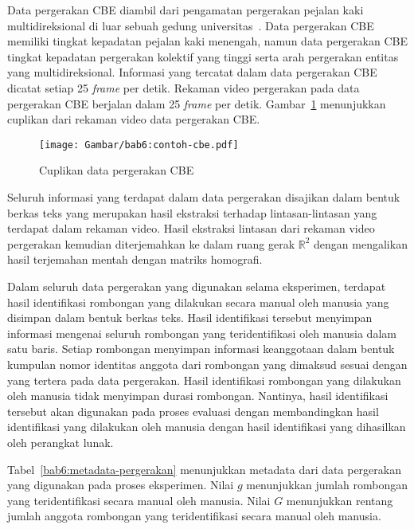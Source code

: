 \begin{enumerate}
    Data pergerakan CBE diambil dari pengamatan pergerakan pejalan kaki multidireksional di luar sebuah gedung universitas~\cite{solera:06:range-reference}. Data pergerakan CBE memiliki tingkat kepadatan pejalan kaki menengah, namun data pergerakan CBE tingkat kepadatan pergerakan kolektif yang tinggi serta arah pergerakan entitas yang multidireksional. Informasi yang tercatat dalam data pergerakan CBE dicatat setiap 25 \textit{frame} per detik. Rekaman video pergerakan pada data pergerakan CBE berjalan dalam 25 \textit{frame} per detik. Gambar~\ref{bab6:contoh-cbe} menunjukkan cuplikan dari rekaman video data pergerakan CBE.
\end{enumerate}

\begin{figure}[t]
    \centering
    \texttt{[image: Gambar/bab6:contoh-cbe.pdf]}
    \caption{Cuplikan data pergerakan CBE}
    \label{bab6:contoh-cbe}
\end{figure}

Seluruh informasi yang terdapat dalam data pergerakan disajikan dalam bentuk berkas teks yang merupakan hasil ekstraksi terhadap lintasan-lintasan yang terdapat dalam rekaman video. Hasil ekstraksi lintasan dari rekaman video pergerakan kemudian diterjemahkan ke dalam ruang gerak $\mathbb{R}^2$ dengan mengalikan hasil terjemahan mentah dengan matriks homografi.

Dalam seluruh data pergerakan yang digunakan selama eksperimen, terdapat hasil identifikasi rombongan yang dilakukan secara manual oleh manusia yang disimpan dalam bentuk berkas teks. Hasil identifikasi tersebut menyimpan informasi mengenai seluruh rombongan yang teridentifikasi oleh manusia dalam satu baris. Setiap rombongan menyimpan informasi keanggotaan dalam bentuk kumpulan nomor identitas anggota dari rombongan yang dimaksud sesuai dengan yang tertera pada data pergerakan. Hasil identifikasi rombongan yang dilakukan oleh manusia tidak menyimpan durasi rombongan. Nantinya, hasil identifikasi tersebut akan digunakan pada proses evaluasi dengan membandingkan hasil identifikasi yang dilakukan oleh manusia dengan hasil identifikasi yang dihasilkan oleh perangkat lunak.

Tabel~\ref{bab6:metadata-pergerakan} menunjukkan metadata dari data pergerakan yang digunakan pada proses eksperimen. Nilai $g$ menunjukkan jumlah rombongan yang teridentifikasi secara manual oleh manusia. Nilai $G$ menunjukkan rentang jumlah anggota rombongan yang teridentifikasi secara manual oleh manusia.

